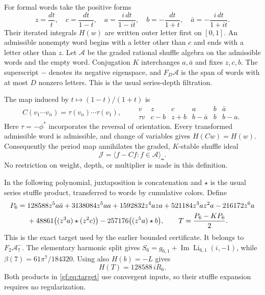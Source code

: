 For formal words take the positive forms
\[
 z=\frac{dt}{t},\quad c=\frac{dt}{1-t},\quad
 a=\frac{i\,dt}{1-it},\quad b=-\frac{dt}{1+t},\quad
 \bar a=-\frac{i\,dt}{1+it}.
\]
Their iterated integrals $H(w)$ are written outer letter first on $[0,1]$.
An admissible nonempty word begins with a letter other than $c$ and ends
with a letter other than $z$. Let $\mathcal A$ be the graded rational
shuffle algebra on the admissible words and the empty word. Conjugation
$K$ interchanges $a,\bar a$ and fixes $z,c,b$. The superscript $-$ denotes
its negative eigenspace, and $F_D\mathcal A$ is the span of words with
at most $D$ nonzero letters. This is the usual series-depth filtration.

The map induced by $t\mapsto(1-t)/(1+t)$ is
\[
 C(v_1\cdots v_n)=\tau(v_n)\cdots\tau(v_1),\qquad
 \begin{array}{c|ccccc}
 v&z&c&a&b&\bar a\\ \hline
 \tau v&c-b&z+b&b-\bar a&b&b-a.
 \end{array}
\]
Here $\tau=-\phi^*$ incorporates the reversal of orientation. Every
transformed admissible word is admissible, and change of variables gives
$H(Cw)=H(w)$. Consequently the period map annihilates the graded,
$K$-stable shuffle ideal
\begin{equation}
 \mathcal J=\langle f-Cf:f\in\mathcal A\rangle_{\shuffle}.
 \label{gf:eq:ideal}
\end{equation}
No restriction on weight, depth, or multiplier is made in this definition.

In the following polynomial, juxtaposition is concatenation and $\star$
is the usual series stuffle product, transferred to words by cumulative
colors. Define
\begin{align}
 P_6={}&128588z^5a\bar a+3138084z^5aa
          +1592832z^4aza+521184z^3az^2a-216172z^6a\notag\\
       &+48861\bigl((z^3a)\star(z^2c)\bigr)
          -257176\bigl((z^5a)\star b\bigr),\qquad
 T=\frac{P_6-KP_6}{2}.
 \label{gf:eq:target}
\end{align}
This is the exact target used by the earlier bounded certificate.
It belongs to $F_2\mathcal A_7^-$. The elementary harmonic split gives
$S_6=g_{6,1}+\operatorname{Im}\operatorname{Li}_{6,1}(i,-1)$, while
$\beta(7)=61\pi^7/184320$. Using also $H(b)=-L$ gives
\begin{equation}
 H(T)=128588\,iR_6.
 \label{gf:eq:target-value}
\end{equation}
Both products in \eqref{gf:eq:target} use convergent inputs, so their
stuffle expansion requires no regularization.

